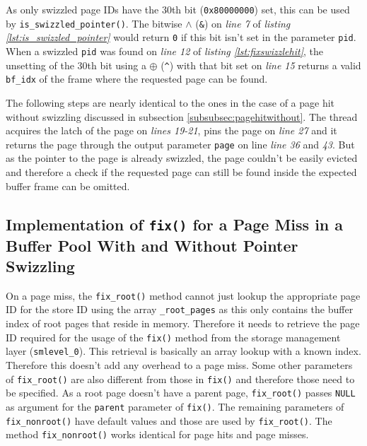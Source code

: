 	As only swizzled page IDs have the 30th bit (\lstinline{0x80000000}) set, this can be used by \lstinline{is_swizzled_pointer()}. The bitwise $\wedge$ (\lstinline{&}) on \emph{line 7} of \emph{listing \ref{lst:is_swizzled_pointer}} would return \lstinline{0} if this bit isn't set in the parameter \lstinline{pid}. When a swizzled \lstinline{pid} was found on \emph{line 12} of \emph{listing \ref{lst:fixswizzlehit}}, the unsetting of the 30th bit using a $\oplus$ (\lstinline{^}) with that bit set on \emph{line 15} returns a valid \lstinline{bf_idx} of the frame where the requested page can be found.
	
	The following steps are nearly identical to the ones in the case of a page hit without swizzling discussed in subsection \ref{subsubsec:pagehitwithout}. The thread acquires the latch of the page on \emph{lines 19-21}, pins the page on \emph{line 27} and it returns the page through the output parameter \lstinline{page} on line \emph{line 36} and \emph{43}. But as the pointer to the page is already swizzled, the page couldn't be easily evicted and therefore a check if the requested page can still be found inside the expected buffer frame can be omitted.

\subsection[Comparison of the Implementations for a Page Miss]{Implementation of \lstinline{fix()} for a Page Miss in a Buffer Pool With and Without Pointer Swizzling} \label{subsec:pagemiss}

	On a page miss, the \lstinline{fix_root()} method cannot just lookup the appropriate page ID for the store ID using the array \lstinline{_root_pages} as this only contains the buffer index of root pages that reside in memory. Therefore it needs to retrieve the page ID required for the usage of the \lstinline{fix()} method from the storage management layer (\lstinline{smlevel_0}). This retrieval is basically an array lookup with a known index. Therefore this doesn't add any overhead to a page miss. Some other parameters of \lstinline{fix_root()} are also different from those in \lstinline{fix()} and therefore those need to be specified. As a root page doesn't have a parent page, \lstinline{fix_root()} passes \lstinline{NULL} as argument for the \lstinline{parent} parameter of \lstinline{fix()}. The remaining parameters of \lstinline{fix_nonroot()} have default values and those are used by \lstinline{fix_root()}.
 The method \lstinline{fix_nonroot()} works identical for page hits and page misses.

